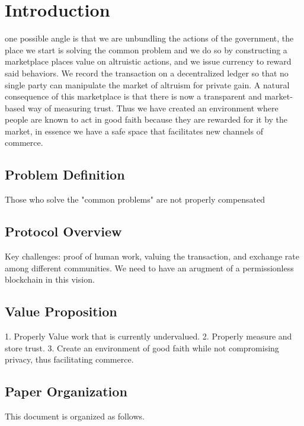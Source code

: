 \section{\textbf{Introduction}}

one possible angle is that we are unbundling the actions of the government, the place we start is solving the common problem
and we do so by constructing a marketplace places value on altruistic actions, and we issue currency to reward said behaviors. 
We record the transaction on a decentralized ledger so that no single party can manipulate the market of altruism for private gain.
A natural consequence of this marketplace is that there is now a transparent and market-based way of measuring trust.
Thus we have created an environment where people are known to act in good faith because they are rewarded for it by the market, 
in essence we have a safe space that facilitates new channels of commerce.

\subsection{Problem Definition}

Those who solve the "common problems" are not properly compensated

\subsection{Protocol Overview}

Key challenges: proof of human work, valuing the transaction, and exchange rate among different communities. We need to have an arugment of a permissionless blockchain in this vision. 

\subsection{Value Proposition}

1. Properly Value work that is currently undervalued. 2. Properly measure and store trust. 3. Create an environment of good faith while not compromising privacy, thus facilitating commerce. 

\subsection{Paper Organization}

This document is organized as follows.

